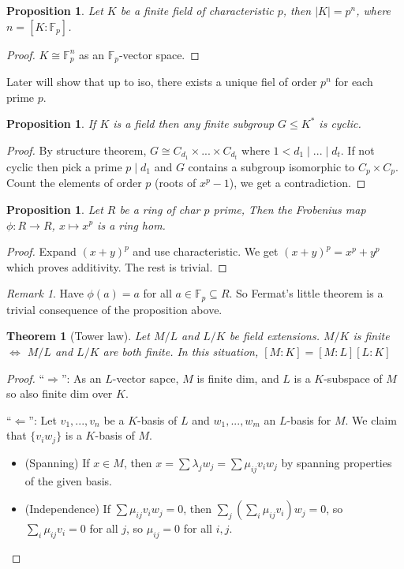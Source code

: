 \documentclass{article}
\theoremstyle{definition}
\theoremstyle{remark}
\newtheorem{rem}{Remark}
\theoremstyle{plain}
\newtheorem{thm}[defn]{Theorem}
\newtheorem{prop}[defn]{Proposition}
\newcommand{\FF}{\mathbb{F}}
\begin{document}
\begin{prop}
    Let $K$ be a finite field of characteristic $p$, then $|K|=p^n$, where $n=[K:\FF_p]$.
\end{prop}
\begin{proof}
    $K\cong\FF_p^n$ as an $\FF_p$-vector space.
\end{proof}
Later will show that up to iso, there exists a unique fiel of order $p^n$ for each prime $p$.
\begin{prop}
    If $K$ is a field then any finite subgroup $G\le K^\ast$ is cyclic.
\end{prop}
\begin{proof}
    By structure theorem, $G\cong C_{d_1}\times...\times C_{d_t}$ where $1<d_1\mid...\mid d_t$. If not cyclic then pick a prime $p\mid d_1$ and $G$ contains a subgroup isomorphic to $C_p\times C_p$. Count the elements of order $p$ (roots of $x^p-1$), we get a contradiction.
\end{proof}
\begin{prop}
    Let $R$ be a ring of char $p$ prime, Then the Frobenius map $\phi:R\to R$, $x\mapsto x^p$ is a ring hom.
\end{prop}
\begin{proof}
    Expand $(x+y)^p$ and use characteristic. We get $(x+y)^p=x^p+y^p$ which proves additivity. The rest is trivial.
\end{proof}
\begin{rem}
    Have $\phi(a)=a$ for all $a\in\FF_p\subseteq R$. So Fermat's little theorem is a trivial consequence of the proposition above.
\end{rem}
\begin{thm}[Tower law]
Let $M/L$ and $L/K$ be field extensions. $M/K$ is finite $\Leftrightarrow$ $M/L$ and $L/K$ are both finite. In this situation, $[M:K]=[M:L][L:K]$
\end{thm}
\begin{proof}
    ``$\Rightarrow$'': As an $L$-vector sapce, $M$ is finite dim, and $L$ is a $K$-subspace of $M$ so also finite dim over $K$.

    ``$\Leftarrow$'': Let $v_1,...,v_n$ be a $K$-basis of $L$ and $w_1,...,w_m$ an $L$-basis for $M$. We claim that $\{v_iw_j\}$ is a $K$-basis of $M$.
    \begin{itemize}
        \item (Spanning) If $x\in M$, then $x=\sum\lambda_j w_j=\sum\mu_{ij}v_iw_j$ by spanning properties of the given basis.
        \item (Independence) If $\sum\mu_{ij}v_iw_j=0$, then $\sum_j\left(\sum_i\mu_{ij}v_i\right)w_j=0$, so $\sum_i\mu_{ij}v_i=0$ for all $j$, so $\mu_{ij}=0$ for all $i,j$.
    \end{itemize}
\end{proof}
\end{document}
